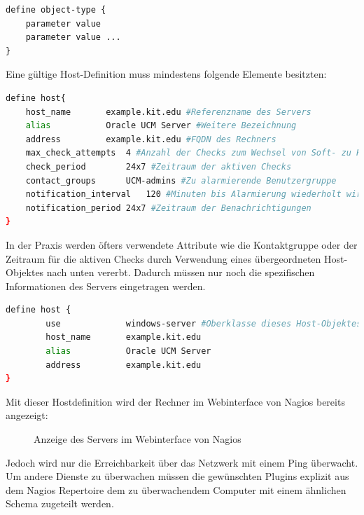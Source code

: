 \begin{lstlisting}[captionpos=b, caption=Nagiosschema für Objektdefinitionen, label=schmeaobj, breaklines = false]
define object-type {
	parameter value
	parameter value ...
}
\end{lstlisting}


Eine gültige Host-Definition muss mindestens folgende Elemente besitzten:

\begin{lstlisting}[captionpos=b, caption=Definition eines Hostobjektes, label=hostobj, breaklines = true, language=sh]
define host{
	host_name		example.kit.edu #Referenzname des Servers
	alias			Oracle UCM Server #Weitere Bezeichnung
	address			example.kit.edu #FQDN des Rechners
	max_check_attempts	4 #Anzahl der Checks zum Wechsel von Soft- zu Hard-State
	check_period		24x7 #Zeitraum der aktiven Checks
	contact_groups		UCM-admins #Zu alarmierende Benutzergruppe
	notification_interval	120 #Minuten bis Alarmierung wiederholt wird
	notification_period	24x7 #Zeitraum der Benachrichtigungen
}
\end{lstlisting}

In der Praxis werden öfters verwendete Attribute wie die Kontaktgruppe oder der Zeitraum für die aktiven Checks durch Verwendung eines übergeordneten Host-Objektes nach unten vererbt.
Dadurch müssen nur noch die spezifischen Informationen des Servers eingetragen werden.
\begin{lstlisting}[captionpos=b, caption=Verkürzte Definition eines Hostobjektes, label=vhostobj, breaklines = true, language=sh]
define host {
        use             windows-server #Oberklasse dieses Host-Objektes
        host_name       example.kit.edu
        alias           Oracle UCM Server
        address         example.kit.edu
}
\end{lstlisting}

Mit dieser Hostdefinition wird der Rechner im Webinterface von Nagios bereits angezeigt:

\begin{figure}[ht]
	\centering
		\caption{Anzeige des Servers im Webinterface von Nagios}
		\label{check-swap}
\end{figure}

Jedoch wird nur die Erreichbarkeit über das Netzwerk mit einem Ping überwacht.
Um andere Dienste zu überwachen müssen die gewünschten Plugins explizit aus dem Nagios Repertoire dem zu überwachendem Computer mit einem ähnlichen Schema zugeteilt werden.

